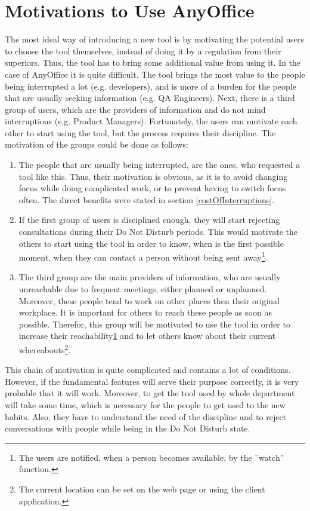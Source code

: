 \documentclass[11pt,singleside]{myfithesis2}
\begin{document}
	\section{Motivations to Use AnyOffice}
The most ideal way of introducing a new tool is by motivating the potential users to choose the tool themselves, instead of doing it by a regulation from their superiors. Thus, the tool has to bring some additional value from using it. In the case of AnyOffice it is quite difficult. The tool brings the most value to the people being interrupted a lot (e.g. developers), and is more of a burden for the people that are usually seeking information (e.g. QA Engineers). Next, there is a third group of users, which are the providers of information and do not mind interruptions (e.g. Product Managers). Fortunately, the users can motivate each other to start using the tool, but the process requires their discipline. The motivation of the groups could be done as follows:
\begin{enumerate}
	\item The people that are usually being interrupted, are the ones, who requested a tool like this. Thus, their motivation is obvious, as it is to avoid changing focus while doing complicated work, or to prevent having to switch focus often. The direct benefits were stated in section \ref{costOfInterruptions}.
	\item If the first group of users is disciplined enough, they will start rejecting consultations during their Do Not Disturb periods. This would motivate the others to start using the tool in order to know, when is the first possible moment, when they can contact a person without being sent away\footnote{\label{note1}The users are notified, when a person becomes available, by the ''watch'' function.}. 
	\item The third group are the main providers of information, who are usually unreachable due to frequent meetings, either planned or unplanned. Moreover, these people tend to work on other places then their original workplace. It is important for others to reach these people as soon as possible. Therefor, this group will be motivated to use the tool in order to increase their reachability\cref{note1} and to let others know about their current whereabouts\footnote{The current location can be set on the web page or using the client application.}.
\end{enumerate}

This chain of motivation is quite complicated and contains a lot of conditions. However, if the fundamental features will serve their purpose correctly, it is very probable that it will work. Moreover, to get the tool used by whole department will take some time, which is necessary for the people to get used to the new habits. Also, they have to understand the need of the discipline and to reject conversations with people while being in the Do Not Disturb state. 
\end{document}
